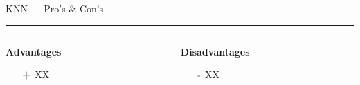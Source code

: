 \documentclass[11pt,compress,t,notes=noshow, xcolor=table]{beamer}
\begin{document}




% 
% 



\LARGE
\begin{frame}{\textcolor{gray!80}{KNN} ~~ Pro's \& Con's}
\normalsize
\vspace{-0.5cm}
\noindent \textcolor{gray!80}{\rule{\textwidth}{1pt}}

\vspace{0.3cm}

\footnotesize


\begin{columns}[onlytextwidth]
  \begin{column}{0.5\textwidth}
    \textbf{\textcolor{gray!80}{Advantages}}
    \footnotesize
    \begin{itemize}
      \item[$\textbf{\textcolor{gray!80}{+}}$] XX
    \end{itemize}
  \end{column}

  \begin{column}{0.5\textwidth}
    \textbf{\textcolor{gray!80}{Disadvantages}}
    \footnotesize
    \begin{itemize}
      \item[$\textbf{\textcolor{gray!80}{-}}$] XX
    \end{itemize}
  \end{column}
\end{columns}

\vfill

\small


\end{frame}
\end{document}
